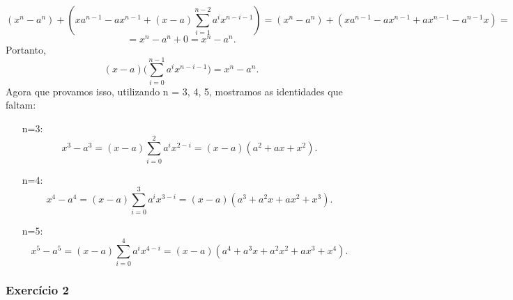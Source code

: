 \documentclass[Calculus1/exercícios_de_cálculo.tex]{subfiles}
\begin{document}
\begin{proof*}
	$$
		(x^n - a^n) + (xa^{n-1} - ax^{n-1} + (x-a)\sum_{i=1}^{n-2}a^ix^{n-i-1}) = (x^n - a^n) + (xa^{n-1} - ax^{n-1} + ax^{n-1} - a^{n-1}x ) =
	$$
	$$
		= x^n - a^n + 0 = x^n - a^n.
	$$
	Portanto,
	$$
		(x - a)\biggl(\sum_{i=0}^{n-1}a^ix^{n-i-1}\biggr) = x^n - a^n.
	$$
	Agora que provamos isso, utilizando n = 3, 4, 5, mostramos as identidades que faltam:
	\begin{itemize}
		\item[n=3:] $$ x^3 - a^3 = (x-a)\sum_{i=0}^{2}a^ix^{2-i} = (x-a)(a^2 + ax + x^2). $$
		\item[n=4:] $$ x^4 - a^4 = (x-a)\sum_{i=0}^{3}a^ix^{3-i} = (x-a)(a^3 + a^2x + ax^2 + x^3). $$
		\item[n=5:] $$ x^5 - a^5 = (x-a)\sum_{i=0}^{4}a^ix^{4-i} = (x-a)(a^4 + a^3x + a^2x^2 + ax^3 + x^4).$$
	\end{itemize}
	\qedsymbol
\end{proof*}

\subsubsection{Exercício 2}
\end{document}
